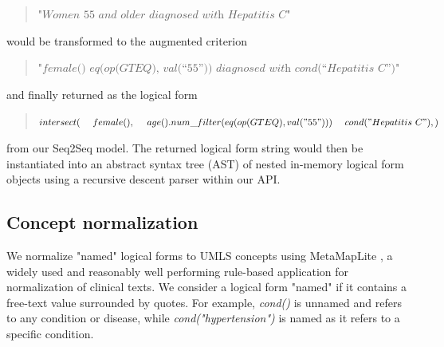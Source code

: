 \documentclass[../main.tex]{subfiles}
\begin{document}
\begin{quote}
    $\textit{"Women 55 and older diagnosed with Hepatitis C"}$
\end{quote}

\noindent would be transformed to the augmented criterion

\begin{quote}
    $\textit{"female() eq(op(GTEQ), val(“55”)) diagnosed with cond(“Hepatitis C”)"}$
\end{quote}

\noindent and finally returned as the logical form

\begin{quote}
$intersect( \\
    \mathrm{\ \ \ \ }female(),\\
    \mathrm{\ \ \ \ }age().num\_filter(eq(op(GTEQ), val("55"))) \\
    \mathrm{\ \ \ \ }cond("Hepatitis\mathrm{\ }C"), \\
)$
\end{quote}

\noindent from our Seq2Seq model. The returned logical form string would then be instantiated into an abstract syntax tree (AST) of nested in-memory logical form objects using a recursive descent parser \cite{johnstone1998generalised} within our API.

\subsection{Concept normalization}

We normalize "named" logical forms to UMLS concepts using MetaMapLite \cite{aronson2001effective, demner2017metamap}, a widely used \cite{abacha2017nlm, liu2019ensembles, wang2020prediction, liu2019doc2hpo, patra2020content} and reasonably well performing rule-based application for normalization of clinical texts. We consider a logical form "named" if it contains a free-text value surrounded by quotes. For example, \textit{cond()} is unnamed and refers to any condition or disease, while \textit{cond("hypertension")} is named as it refers to a specific condition. 
\end{document}
